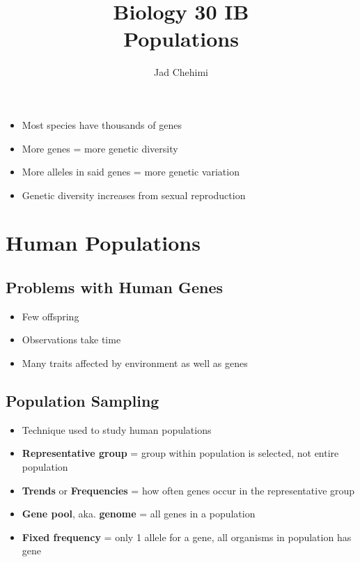 \documentclass[a4paper,12pt]{article}
\title{Biology 30 IB \\ Populations}
\author{Jad Chehimi}
\begin{document}
\maketitle

\tableofcontents

\pagebreak

\begin{itemize}
    \item{Most species have thousands of genes}
    \item{More genes = more genetic diversity}
    \item{More alleles in said genes = more genetic variation}
    \item{Genetic diversity increases from sexual reproduction}
\end{itemize}

\section{Human Populations}
\subsection{Problems with Human Genes}
\begin{itemize}
    \item{Few offspring}
    \item{Observations take time}
    \item{Many traits affected by environment as well as genes}
\end{itemize}

\subsection{Population Sampling}
\begin{itemize}
    \item{Technique used to study human populations}
    \item{\textbf{Representative group} = group within population is selected, not entire population}
    \item{\textbf{Trends} or \textbf{Frequencies} = how often genes occur in the representative group}
    \item{\textbf{Gene pool}, aka. \textbf{genome} = all genes in a population}
    \item{\textbf{Fixed frequency} = only 1 allele for a gene, all organisms in population has gene}
\end{itemize}
\end{document}
